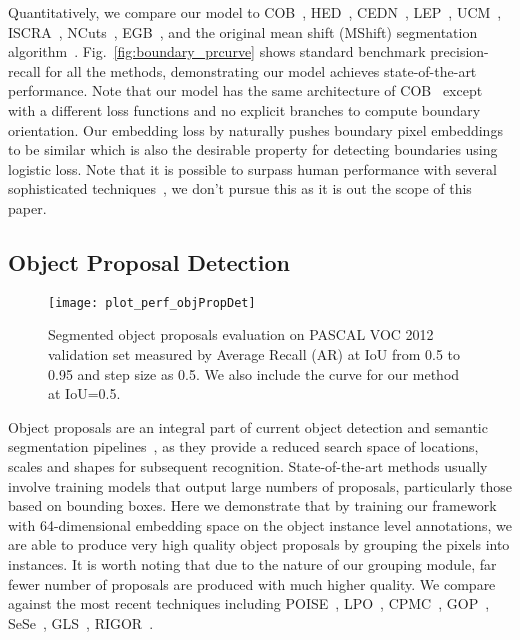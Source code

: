 \documentclass[10pt,twocolumn,letterpaper]{article}
\begin{document}
Quantitatively,
we compare our model to
COB~\cite{maninis2017convolutional},
HED~\cite{xie2015holistically},
CEDN~\cite{yang2016object},
LEP~\cite{najman1996geodesic},
UCM~\cite{arbelaez2011contour},
ISCRA~\cite{ren2013image},
NCuts~\cite{shi2000normalized},
EGB~\cite{felzenszwalb2004efficient},
and the original mean shift (MShift) segmentation algorithm~\cite{comaniciu2002mean}.
Fig.~\ref{fig:boundary_prcurve} shows standard benchmark precision-recall for
all the methods, demonstrating our model achieves state-of-the-art performance.
Note that our model has the same architecture of COB~\cite{maninis2017convolutional}
except with a different
loss functions and no explicit branches to compute boundary orientation.  Our
embedding loss by naturally pushes boundary pixel embeddings to be similar
which is also the desirable property for detecting boundaries using logistic
loss.  Note that it is possible to surpass human performance with several
sophisticated techniques~\cite{kokkinos2015pushing}, we don't pursue
this as it is out the scope of this paper.

\subsection{Object Proposal Detection}\begin{figure}[t]
\centering
   \texttt{[image: plot\_perf\_objPropDet]}
   \vspace{-6mm}
   \caption{Segmented object proposals evaluation on PASCAL VOC 2012 validation
   set measured by Average Recall (AR) at IoU from 0.5 to 0.95 and step size as 0.5.
   We also include the curve for our method at IoU=0.5.
   }
\label{fig:plot_perf_objPropDet}
\end{figure}

Object proposals are an integral part of current object detection and semantic
segmentation pipelines~\cite{ren2015faster, he2017mask}, as they provide a
reduced search space of locations, scales and shapes for subsequent
recognition.  State-of-the-art methods usually involve training models that
output large numbers of proposals, particularly those based on bounding boxes.
Here we demonstrate that by training our framework with 64-dimensional
embedding space on the object instance level annotations, we are able to
produce very high quality object proposals by grouping the pixels into
instances.  It is worth noting that due to the nature of our grouping module,
far fewer number of proposals are produced with much higher quality.  We
compare against the most recent techniques including
POISE~\cite{humayun2015middle},
LPO~\cite{krahenbuhl2015learning},
CPMC~\cite{carreira2012cpmc},
GOP~\cite{krahenbuhl2014geodesic},
SeSe~\cite{uijlings2013selective},
GLS~\cite{rantalankila2014generating},
RIGOR~\cite{humayun2014rigor}.
\end{document}
